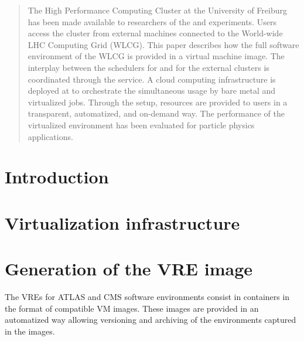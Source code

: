 \date{Received: date / Accepted: date}


\maketitle

\begin{abstract}
The \NEMO High Performance Computing Cluster at the University of
Frei\-burg has been made available to
researchers of the \ATLAS and \CMS experiments.
Users access the cluster from external machines connected to the
World-wide LHC Computing Grid (WLCG).
 This paper describes how the full software environment of the WLCG
 is provided in a virtual machine image. The interplay between the
 schedulers for \NEMO and for the external
 clusters is coordinated through the \Roced service.
A cloud computing infrastructure is deployed at \NEMO to orchestrate the
simultaneous usage by bare metal and virtualized jobs.
Through the setup, resources are provided to users in a transparent,
automatized, and
on-demand way. The performance of the virtualized environment has been
evaluated for particle physics applications.

\end{abstract}




\section{Introduction}
\label{intro}


\section{Virtualization infrastructure}
\label{sec:openstack}


\section{Generation of the VRE image}
The VREs for ATLAS and CMS software environments consist in \Openstack containers
in the format of compatible VM images.
These images are provided in an automatized
way allowing versioning and archiving of the environments captured in
the images.

